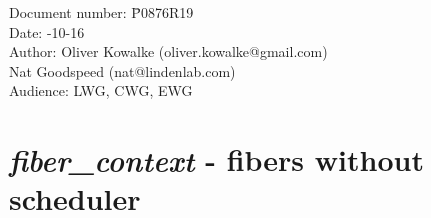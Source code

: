 \documentclass[fontsize=10pt,paper=A4,pagesize,DIV=15]{scrartcl}
\begin{document}
\small
\begin{tabbing}
    Document number: \= P0876R19\\
    Date:            -10-16\\
    Author:          \> Oliver Kowalke (oliver.kowalke@gmail.com)\\
                     \> Nat Goodspeed (nat@lindenlab.com)\\
    Audience:        \> LWG, CWG, EWG\\
\end{tabbing}

\section*{\emph{fiber\_context} - fibers without scheduler}


\tableofcontents




\newpage























\end{document}
